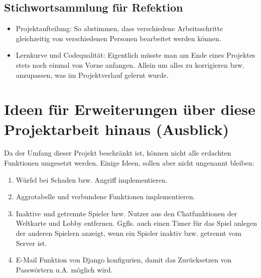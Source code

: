 \subsection{Stichwortsammlung für Refektion}

\begin{itemize}
    \item Projektaufteilung: So abstimmen, dass verschiedene Arbeitsschritte gleichzeitig von verschiedenen Personen bearbeitet werden können.  
    \item Lernkurve und Codequalität: Eigentlich müsste man am Ende eines Projektes stets noch einmal von Vorne anfangen. Allein um alles zu korrigieren bzw. anzupassen, was im Projektverlauf gelernt wurde.
\end{itemize}


\section{Ideen für Erweiterungen über diese Projektarbeit hinaus (Ausblick)} \label{ausblick}

Da der Umfang dieser Projekt beschränkt ist, können nicht alle erdachten Funktionen umgesetzt werden. Einige Ideen, sollen aber nicht ungenannt bleiben: 
\begin{enumerate}
    \item Würfel bei Schaden bzw. Angriff implementieren.
    \item Aggrotabelle und verbundene Funktionen implementieren.
    \item Inaktive und getrennte Spieler bzw. Nutzer aus den Chatfunktionen der Weltkarte und Lobby entfernen. Ggfls. auch einen Timer für das Spiel anlegen der anderen Spielern anzeigt, wenn ein Spieler inaktiv bzw. getrennt vom Server ist. 
    \item E-Mail Funktion von Django konfigurien, damit das Zurücksetzen von Passwörtern u.A. möglich wird.
\end{enumerate}

